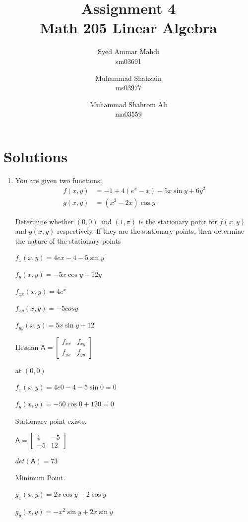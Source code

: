 \documentclass[answers, a4paper, 11pt]{exam}
\title{Assignment 4 \\ Math 205 Linear Algebra}
\author{Syed Ammar Mahdi \\sm03691 \and Muhammad Shahzain \\ms03977 \and Muhammad Shahrom Ali \\ma03559}
\newcommand{\mat}[1]{\boldsymbol { \mathsf{#1}} }
\begin{document}
\setlength{\parskip}{10pt} %
\setlength{\parindent}{0pt}
\maketitle

\section*{Solutions}
\begin{enumerate} 


\item You are given two functions:
\begin{align}
f(x,y) &= -1 + 4(e^x - x) - 5x\sin y + 6y^2 \\
g(x,y) &= (x^2 - 2x)\cos y
\end{align}

Determine whether $(0, 0)$ and $(1, \pi)$ is the stationary point for $f(x,y)$ and $g(x,y)$ respectively. If they are the stationary points, then determine the nature of the stationary points

\begin{solution}

$f_x(x,y) = 4e{x} - 4 - 5\sin{y}$

$f_y(x,y) = -5x\cos{y} + 12y$

$f_{xx}(x,y) = 4e^x$

$f_{xy}(x,y) = -5cosy$

$f_{yy}(x,y) = 5x\sin{y} + 12$

Hessian $\mat A = 
\begin{bmatrix}
f_{xx} & f_{xy} \\ f_{yx} & f_{yy}
\end{bmatrix}
$

at $(0,0)$

$f_x(x,y) = 4e{0} - 4 - 5\sin{0} = 0$

$f_y(x,y) = -50\cos{0} + 120 = 0$

Stationary point exists.

$\mat A = 
\begin{bmatrix}
4 & -5 \\ -5 & 12
\end{bmatrix}
$

$det(\mat A) = 73$

Minimum Point.

$g_x(x,y) = 2x\cos{y} - 2\cos{y}$

$g_y(x,y) = -x^2\sin{y} + 2x\sin{y}$


\end{solution}
\end{enumerate}
\end{document}
